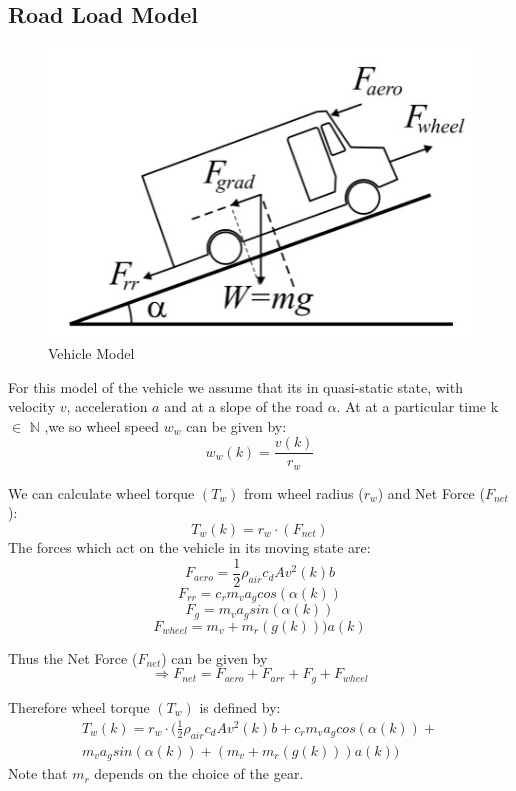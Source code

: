\documentclass[conference]{IEEEtran}
\begin{document}
\subsection{Road Load Model}

\begin{figure}[h]
    \centering
    \includegraphics[scale = 0.45]{road load model.jpeg}
    \caption{Vehicle Model}
    \label{fig:}
\end{figure}

For this model of the vehicle we assume that its in quasi-static state, with velocity $v$, acceleration $a$ and at a slope of the road $\alpha$. At at a particular time k $\in$ $\mathbb{N}$ ,we so wheel speed $w_w$ can be given by:
\begin{equation}\label{eq1}
w_w(k) = \frac{v(k)}{r_w}
\end{equation}

We can calculate wheel torque $(T_w)$ from wheel radius ($r_w$) and Net Force ($F_{net}$):
\[T_w(k) = r_w \cdot (F_{net})
\]
The forces which act on the vehicle in its moving state are: \\
\[F_{aero} = \frac{1}{2}\rho_{air}c_d Av^2(k)b
\]
\[F_{rr} = c_r m_v a_g  cos(\alpha(k))
\]
\[F_g = m_v a_g sin(\alpha(k))
\]
\[F_{wheel} = m_v + m_r(g(k))) a(k)
\]

Thus the Net Force ($F_{net}$) can be given by \\
\[ \Rightarrow F_{net} = F_{aero} + F_{arr} + F_g + F_{wheel}
\]

Therefore wheel torque $(T_w)$ is defined by:
\vspace{-6pt}
\begin{multline}
T_w(k) = r_w \cdot (\frac{1}{2}\rho_{air}c_d Av^2(k)b + c_r m_v a_g  cos(\alpha(k)) + \\m_v a_g sin(\alpha(k))  + (m_v +m_r(g(k))) a(k))
\end{multline}
Note that $m_r$ depends on the choice of the gear.
\end{document}
